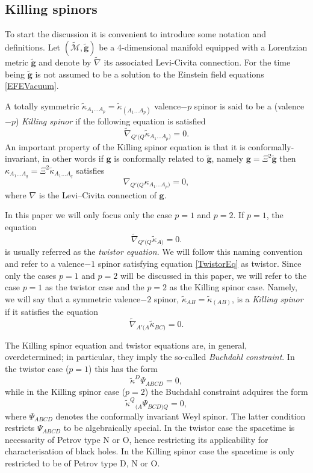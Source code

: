 \documentclass[10pt,a4paper]{article}
\theoremstyle{plain}
\def\bmg{{\bm g}}
\begin{document}
\subsection{Killing spinors}\label{Sec:KillingSpinors}

To start the discussion it is convenient to introduce some notation
and definitions. Let $(\tilde{\mathcal{M}},\tilde{\bmg})$ be a
4-dimensional manifold equipped with a Lorentzian metric
$\tilde{\bmg}$ and denote by $\tilde{\nabla}$ its associated
Levi-Civita connection.  For the time being $\tilde{\bmg}$ is not
assumed to be a solution to the Einstein field equations
\eqref{EFEVacuum}.

{\color{blue}
A totally symmetric
$\tilde{\kappa}_{A_1...A_p}=\tilde{\kappa}_{(A_1...A_p)}$ valence$-p$
spinor is said to be a (valence$-p$) \emph{Killing spinor}
if the following equation is
satisfied
\begin{equation}\label{qValenceKillingspinor}
\tilde{\nabla}_{Q'(Q}\tilde{\kappa}_{A_1...A_p)}=0.
\end{equation}
An important property of the Killing spinor equation is that it is
conformally-invariant, in other words if $\bmg$ is conformally related
to $\tilde{\bmg}$, namely $\bmg=\Xi^2\tilde{\bmg}$ then
${\kappa}_{A_1...A_q}=\Xi^2 \tilde{\kappa}_{A_1...A_q}$ satisfies
\[{\nabla}_{Q'(Q}{\kappa}_{A_1...A_p)}=0,\]
where ${\nabla}$ is the Levi--Civita connection of ${\bmg}$.

\medskip
\noindent In this paper we will only focus only the case $p=1$ and $p=2$.
If $p=1$, the equation
\begin{equation}\label{TwistorEq}
  \tilde{\nabla}_{Q'(Q}\tilde{\kappa}_{A)}=0.
\end{equation}
is usually referred as the \emph{twistor equation}. We will follow
this naming convention and refer to a valence$-1$ spinor satisfying
equation \eqref{TwistorEq} as twistor.  Since only the cases $p=1$ and
$p=2$ will be discussed in this paper, we will refer to the case $p=1$
as the twistor case and the $p=2$ as the Killing spinor case. Namely,
we will say that a symmetric valence$-2$ spinor,
$\tilde{\kappa}_{AB}=\tilde{\kappa}_{(AB)}$, is a \textit{Killing
  spinor} if it satisfies the equation
\begin{equation}
\tilde{\nabla}_{A'(A}\tilde{\kappa}_{BC)}=0.
\end{equation}

The Killing spinor equation and twistor equations are, in general,
overdetermined; in particular, they imply the so-called
\textit{Buchdahl constraint}.  In the twistor case ($p=1$) this has
the form
\[
\tilde{\kappa}^D\Psi_{ABCD}=0,
\]
while in the Killing spinor case ($p=2$) the Buchdahl constraint
adquires the form
\[
\tilde{\kappa}^Q{}_{(A}\Psi_{BCD)Q}=0,
\]
where $\Psi_{ABCD}$ denotes the conformally invariant Weyl spinor.
The latter condition restricts $\Psi_{ABCD}$ to be algebraically
special.  In the twistor case the spacetime is necessarity of Petrov
type N or O, hence restricting its applicability for characterisation of
black holes.  In the Killing spinor case the spacetime is only
restricted to be of Petrov type D, N or O.

}
\end{document}
